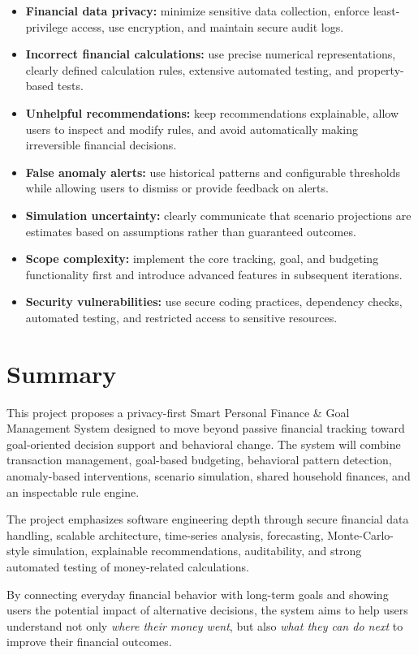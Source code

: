 \documentclass[11pt,a4paper]{article}
\begin{document}
\begin{itemize}[leftmargin=0.7cm]

    \item \textbf{Financial data privacy:} minimize sensitive data collection,
    enforce least-privilege access, use encryption, and maintain secure audit
    logs.
    
    \item \textbf{Incorrect financial calculations:} use precise numerical
    representations, clearly defined calculation rules, extensive automated
    testing, and property-based tests.
    
    \item \textbf{Unhelpful recommendations:} keep recommendations
    explainable, allow users to inspect and modify rules, and avoid
    automatically making irreversible financial decisions.
    
    \item \textbf{False anomaly alerts:} use historical patterns and
    configurable thresholds while allowing users to dismiss or provide
    feedback on alerts.
    
    \item \textbf{Simulation uncertainty:} clearly communicate that scenario
    projections are estimates based on assumptions rather than guaranteed
    outcomes.
    
    \item \textbf{Scope complexity:} implement the core tracking, goal, and
    budgeting functionality first and introduce advanced features in
    subsequent iterations.
    
    \item \textbf{Security vulnerabilities:} use secure coding practices,
    dependency checks, automated testing, and restricted access to sensitive
    resources.
    
\end{itemize}


\section{Summary}

This project proposes a privacy-first Smart Personal Finance \& Goal
Management System designed to move beyond passive financial tracking toward
goal-oriented decision support and behavioral change. The system will combine
transaction management, goal-based budgeting, behavioral pattern detection,
anomaly-based interventions, scenario simulation, shared household finances,
and an inspectable rule engine.

The project emphasizes software engineering depth through secure financial
data handling, scalable architecture, time-series analysis, forecasting,
Monte-Carlo-style simulation, explainable recommendations, auditability, and
strong automated testing of money-related calculations.

By connecting everyday financial behavior with long-term goals and showing
users the potential impact of alternative decisions, the system aims to help
users understand not only \emph{where their money went}, but also
\emph{what they can do next} to improve their financial outcomes.
\end{document}
